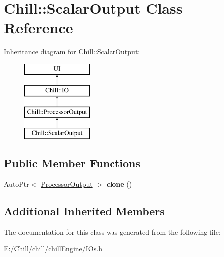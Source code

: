 \hypertarget{class_chill_1_1_scalar_output}{}\section{Chill\+:\+:Scalar\+Output Class Reference}
\label{class_chill_1_1_scalar_output}
Inheritance diagram for Chill\+:\+:Scalar\+Output\+:\begin{figure}[H]
\begin{center}
\leavevmode
\includegraphics[height=4.000000cm]{class_chill_1_1_scalar_output}
\end{center}
\end{figure}
\subsection*{Public Member Functions}
\begin{DoxyCompactItemize}
\item 
\mbox{\label{class_chill_1_1_scalar_output_a3e9605d5191b7299bf132ee1e423c9d2}} 
Auto\+Ptr$<$ \mbox{\hyperlink{class_chill_1_1_processor_output}{Processor\+Output}} $>$ {\bfseries clone} ()
\end{DoxyCompactItemize}
\subsection*{Additional Inherited Members}


The documentation for this class was generated from the following file\+:\begin{DoxyCompactItemize}
\item 
E\+:/\+Chill/chill/chill\+Engine/\mbox{\hyperlink{_i_os_8h}{I\+Os.\+h}}\end{DoxyCompactItemize}
